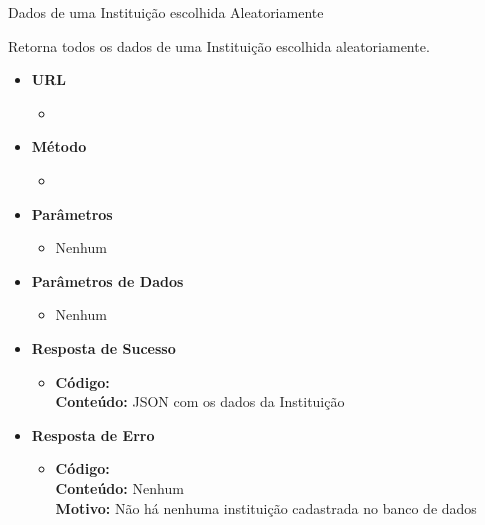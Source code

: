 
\begin{caixa}{Dados de uma Instituição escolhida Aleatoriamente}{}

Retorna todos os dados de uma Instituição escolhida aleatoriamente.

\begin{itemize}
\item \textbf{URL}
	\begin{itemize}
		\item {}
	\end{itemize}

\item \textbf{Método}
	\begin{itemize}
		\item {}
	\end{itemize}

\item \textbf{Parâmetros}
	\begin{itemize}
		\item Nenhum
	\end{itemize}

\item \textbf{Parâmetros de Dados}
	\begin{itemize}
		\item Nenhum
	\end{itemize}

\item \textbf{Resposta de Sucesso}
	\begin{itemize}
		\item \textbf{Código:}  \\ \textbf{Conteúdo:} JSON com os dados da Instituição
	\end{itemize}

\item \textbf{Resposta de Erro}
	\begin{itemize}
		\item \textbf{Código:}  \\ \textbf{Conteúdo:} Nenhum \\ \textbf{Motivo:} Não há nenhuma instituição cadastrada no banco de dados
	\end{itemize}

\end{itemize}
\end{caixa}

